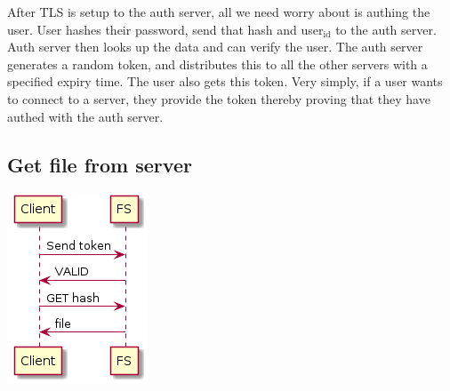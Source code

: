 \documentclass[11pt]{article}
\begin{document}
After TLS is setup to the auth server, all we need worry about is authing the user. User hashes their password, send that hash and user\(_{\text{id}}\) to the auth server. Auth server then looks up the data and can verify the user.
The auth server generates a random token, and distributes this to all the other servers with a specified expiry time. The user also gets this token. Very simply, if a user wants to connect to a server, they
provide the token thereby proving that they have authed with the auth server.

\subsection{Get file from server}
\label{sec:org3f08346}


\begin{center}
\includegraphics[width=.9\linewidth]{get_file.png}
\end{center}
\end{document}
